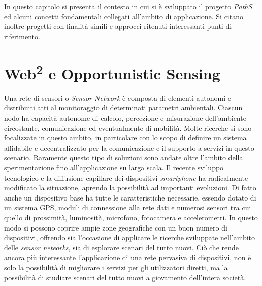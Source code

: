 In questo capitolo si presenta il contesto in cui si è sviluppato il progetto \emph{PathS} ed alcuni concetti fondamentali collegati all'ambito di applicazione. Si citano inoltre progetti con finalità simili e approcci ritenuti interessanti punti di riferimento.

\section{Web\textsuperscript{2} e Opportunistic Sensing}
Una rete di sensori o \emph{Sensor Network} è composta di elementi autonomi e distribuiti atti al monitoraggio di determinati parametri ambientali. Ciascun nodo ha capacità autonome di calcolo, percezione e misurazione dell'ambiente circostante, comunicazione ed eventualmente di mobilità. Molte ricerche si sono focalizzate in questo ambito, in particolare con lo scopo di definire un sistema affidabile e decentralizzato per la comunicazione e il supporto a servizi in questo scenario. Raramente questo tipo di soluzioni sono andate oltre l'ambito della sperimentazione fino all'applicazione su larga scala. Il recente sviluppo tecnologico e la diffusione capillare dei dispositivi \emph{smartphone} ha radicalmente modificato la situazione, aprendo la possibilità ad importanti evoluzioni. Di fatto anche un dispositivo base ha tutte le caratteristiche necessarie, essendo dotato di un sistema GPS, moduli di connessione alla rete dati e numerosi sensori tra cui quello di prossimità, luminosità, microfono, fotocamera e accelerometri. In questo modo si possono coprire ampie zone geografiche con un buon numero di dispositivi, offrendo sia l'occasione di applicare le ricerche sviluppate nell'ambito delle \emph{sensor neteorks}, sia di esplorare scenari del tutto nuovi. Ciò che rende ancora più interessante l'applicazione di una rete pervasiva di dispositivi, non è solo la possibilità di migliorare i servizi per gli utilizzatori diretti, ma la possibilità di studiare scenari del tutto nuovi a giovamento dell'intera società.

